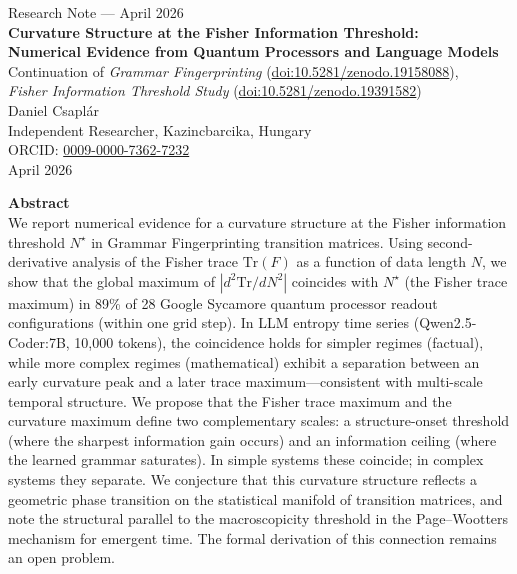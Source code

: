 \documentclass[11pt,a4paper]{article}
\begin{document}
\begin{center}
{\large Research Note --- April 2026}\\[0.8em]
{\LARGE\bfseries Curvature Structure at the Fisher Information Threshold:\\[0.25em]
Numerical Evidence from Quantum Processors and Language Models}\\[0.9em]
{\large Continuation of \textit{Grammar Fingerprinting} (\href{https://doi.org/10.5281/zenodo.19158088}{doi:10.5281/zenodo.19158088}),\\
\textit{Fisher Information Threshold Study} (\href{https://doi.org/10.5281/zenodo.19391582}{doi:10.5281/zenodo.19391582})}\\[0.5em]
Daniel Csapl\'ar\\
Independent Researcher, Kazincbarcika, Hungary\\
ORCID: \href{https://orcid.org/0009-0000-7362-7232}{0009-0000-7362-7232}\\
April 2026
\end{center}

\vspace{0.6em}
\noindent\textbf{Abstract}\\[0.3em]
We report numerical evidence for a curvature structure at the Fisher information threshold $N^\star$ in Grammar Fingerprinting transition matrices. Using second-derivative analysis of the Fisher trace $\mathrm{Tr}(F)$ as a function of data length $N$, we show that the global maximum of $|d^2\mathrm{Tr}/dN^2|$ coincides with $N^\star$ (the Fisher trace maximum) in 89\% of 28 Google Sycamore quantum processor readout configurations (within one grid step). In LLM entropy time series (Qwen2.5-Coder:7B, 10{,}000 tokens), the coincidence holds for simpler regimes (factual), while more complex regimes (mathematical) exhibit a separation between an early curvature peak and a later trace maximum---consistent with multi-scale temporal structure. We propose that the Fisher trace maximum and the curvature maximum define two complementary scales: a structure-onset threshold (where the sharpest information gain occurs) and an information ceiling (where the learned grammar saturates). In simple systems these coincide; in complex systems they separate. We conjecture that this curvature structure reflects a geometric phase transition on the statistical manifold of transition matrices, and note the structural parallel to the macroscopicity threshold in the Page--Wootters mechanism for emergent time. The formal derivation of this connection remains an open problem.
\end{document}
